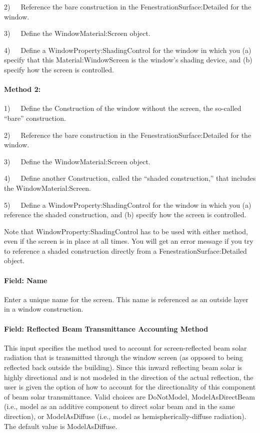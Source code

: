 2)~~~Reference the bare construction in the FenestrationSurface:Detailed for the window.

3)~~~Define the WindowMaterial:Screen object.

4)~~~Define a WindowProperty:ShadingControl for the window in which you (a) specify that this Material:WindowScreen is the window's shading device, and (b) specify how the screen is controlled.

\paragraph{Method 2:}\label{method-2-2}

1)~~~Define the Construction of the window without the screen, the so-called ``bare'' construction.

2)~~~Reference the bare construction in the FenestrationSurface:Detailed for the window.

3)~~~Define the WindowMaterial:Screen object.

4)~~~Define another Construction, called the ``shaded construction,'' that includes the WindowMaterial:Screen.

5)~~~Define a WindowProperty:ShadingControl for the window in which you (a) reference the shaded construction, and (b) specify how the screen is controlled.

Note that WindowProperty:ShadingControl has to be used with either method, even if the screen is in place at all times. You will get an error message if you try to reference a shaded construction directly from a FenestrationSurface:Detailed object.

\paragraph{Field: Name}\label{field-name-19-004}

Enter a unique name for the screen. This name is referenced as an outside layer in a window construction.

\paragraph{Field: Reflected Beam Transmittance Accounting Method}\label{field-reflected-beam-transmittance-accounting-method}

This input specifies the method used to account for screen-reflected beam solar radiation that is transmitted through the window screen (as opposed to being reflected back outside the building). Since this inward reflecting beam solar is highly directional and is not modeled in the direction of the actual reflection, the user is given the option of how to account for the directionality of this component of beam solar transmittance. Valid choices are DoNotModel, ModelAsDirectBeam (i.e., model as an additive component to direct solar beam and in the same direction), or ModelAsDiffuse (i.e., model as hemispherically-diffuse radiation). The default value is ModelAsDiffuse.

